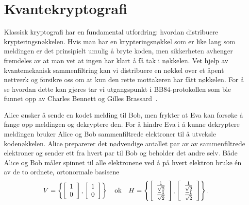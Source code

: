 \chapter{Kvantekryptografi}

Klassisk kryptografi har en fundamental utfordring: hvordan distribuere krypteringsnøkkelen. Hvis man har en krypteringsnøkkel som er like lang som meldingen er det prinsipielt umulig å bryte koden, men sikkerheten avhenger fremdeles av at man vet at ingen har klart å få tak i nøkkelen. Vet hjelp av kvantemekanisk sammenfiltring kan vi distribuere en nøkkel over et åpent nettverk og forsikre oss om at kun den rette mottakeren har fått nøkkelen. For å se hvordan dette kan gjøres tar vi utgangspunkt i BB84-protokollen som ble funnet opp av Charles Bennett og Gilles Brassard~\cite{bb84}.

Alice ønsker å sende en kodet melding til Bob, men frykter at Eva kan forsøke å fange opp meldingen og dekryptere den. For å hindre Eva i å kunne dekryptere meldingen bruker Alice og Bob sammenfiltrede elektroner til å utveksle kodenøkkelen. Alice preparerer det nødvendige antallet par av av sammenfiltrede elektroner og sender ett fra hvert par til Bob og beholder det andre selv. Både Alice og Bob måler spinnet til alle elektronene ved å på hvert elektron bruke \'en av de to ordnete, ortonormale basisene
\begin{displaymath}
	V = \left\{ \left[\begin{array}{c}1\\0\end{array}\right], \left[\begin{array}{c}1\\0\end{array}\right] \right\} 
	\quad \mathrm{ok} \quad 
	H = \left\{ \left[\begin{array}{c}\frac{1}{\sqrt{2}}\\ \frac{-1}{\sqrt{2}}\end{array}\right], \left[\begin{array}{c}\frac{1}{\sqrt{2}}\\ \frac{-1}{\sqrt{2}}\end{array}\right] \right\}.
\end{displaymath}

